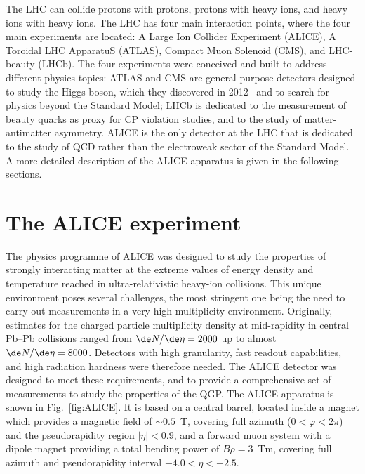 \begin{sloppypar}
The LHC can collide protons with protons, protons with heavy ions, and heavy ions with heavy ions. The LHC has four main interaction points, where the four main experiments are located: A Large Ion Collider Experiment (ALICE), A Toroidal LHC ApparatuS (ATLAS), Compact Muon Solenoid (CMS), and LHC-beauty (LHCb). The four experiments were conceived and built to address different physics topics: ATLAS and CMS are general-purpose detectors designed to study the Higgs boson, which they discovered in 2012~\cite{ATLAS:2012yve,CMS:2012qbp} and to search for physics beyond the Standard Model; LHCb is dedicated to the measurement of beauty quarks as proxy for CP violation studies, and to the study of matter-antimatter asymmetry. ALICE is the only detector at the LHC that is dedicated to the study of QCD rather than the electroweak sector of the Standard Model. A more detailed description of the ALICE apparatus is given in the following sections.
\end{sloppypar}

\section{The ALICE experiment}
The physics programme of ALICE was designed to study the properties of strongly interacting matter at the extreme values of energy density and temperature reached in ultra-relativistic heavy-ion collisions. This unique environment poses several challenges, the most stringent one being the need to carry out measurements in a very high multiplicity environment. Originally, estimates for the charged particle multiplicity density at mid-rapidity in central Pb--Pb collisions ranged from $\de N/\de\eta = 2000$ up to almost $\de N/\de\eta = 8000$. Detectors with high granularity, fast readout capabilities, and high radiation hardness were therefore needed. The ALICE detector was designed to meet these requirements, and to provide a comprehensive set of measurements to study the properties of the QGP. The ALICE apparatus is shown in Fig.~\ref{fig:ALICE}. It is based on a central barrel, located inside a magnet which provides a magnetic field of $\sim 0.5$~T, covering full azimuth ($0 < \varphi < 2\pi$) and the pseudorapidity region $\lvert \eta\rvert <0.9$, and a forward muon system with a dipole magnet providing a total bending power of $B\rho = 3$~Tm, covering full azimuth and pseudorapidity interval $-4.0 < \eta < -2.5$.

